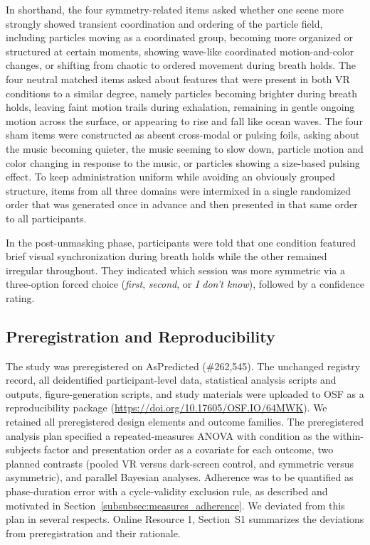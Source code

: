 \documentclass[pdflatex,sn-basic,lineno]{sn-jnl}
\begin{document}
In shorthand, the four symmetry-related items asked whether one scene more strongly showed transient coordination and ordering of the particle field, including particles moving as a coordinated group, becoming more organized or structured at certain moments, showing wave-like coordinated motion-and-color changes, or shifting from chaotic to ordered movement during breath holds. The four neutral matched items asked about features that were present in both VR conditions to a similar degree, namely particles becoming brighter during breath holds, leaving faint motion trails during exhalation, remaining in gentle ongoing motion across the surface, or appearing to rise and fall like ocean waves. The four sham items were constructed as absent cross-modal or pulsing foils, asking about the music becoming quieter, the music seeming to slow down, particle motion and color changing in response to the music, or particles showing a size-based pulsing effect. To keep administration uniform while avoiding an obviously grouped structure, items from all three domains were intermixed in a single randomized order that was generated once in advance and then presented in that same order to all participants.

In the post-unmasking phase, participants were told that one condition featured brief visual synchronization during breath holds while the other remained irregular throughout. They indicated which session was more symmetric via a three-option forced choice (\emph{first}, \emph{second}, or \emph{I don't know}), followed by a confidence rating.

\subsection{Preregistration and Reproducibility}\label{subsec:stats}

The study was preregistered on AsPredicted (\#262,545). The unchanged registry record, all deidentified participant-level data, statistical analysis scripts and outputs, figure-generation scripts, and study materials were uploaded to OSF as a reproducibility package (\url{https://doi.org/10.17605/OSF.IO/64MWK}). We retained all preregistered design elements and outcome families. The preregistered analysis plan specified a repeated-measures ANOVA with condition as the within-subjects factor and presentation order as a covariate for each outcome, two planned contrasts (pooled VR versus dark-screen control, and symmetric versus asymmetric), and parallel Bayesian analyses. Adherence was to be quantified as phase-duration error with a cycle-validity exclusion rule, as described and motivated in Section~\ref{subsubsec:measures_adherence}. We deviated from this plan in several respects. Online Resource 1, Section~S1 summarizes the deviations from preregistration and their rationale.
\end{document}
